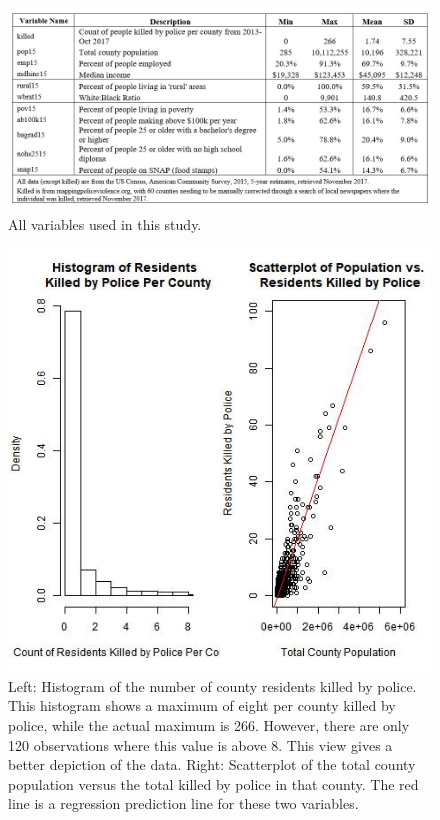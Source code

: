 \documentclass[sigconf]{acmart}
\begin{document}
\begin{figure}
\includegraphics[width=1.0\textwidth]{images/table1.jpg}
\caption{All variables used in this study.}
\end{figure}

\begin{figure}
\includegraphics[width=1.0\textwidth]{images/figure4.jpg}
\caption{Left: Histogram of the number of county residents killed by police.  This histogram shows a maximum of eight per county killed by police, while the actual maximum is 266.  However, there are only 120 observations where this value is above 8.  This view gives a better depiction of the data.  Right: Scatterplot of the total county population versus the total killed by police in that county.  The red line is a regression prediction line for these two variables.}
\end{figure}
\end{document}
